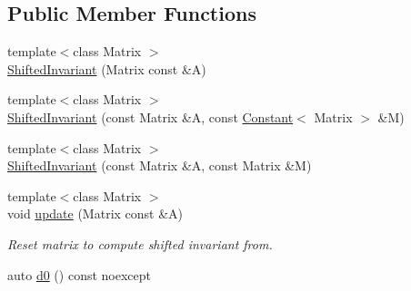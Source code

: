 \subsection*{Public Member Functions}
\begin{DoxyCompactItemize}
\item 
{\footnotesize template$<$class Matrix $>$ }\\\hyperlink{classFunG_1_1LinearAlgebra_1_1ShiftedInvariant_ac70bec154e9bc6f7c66f48e4b4c7dd6f}{Shifted\-Invariant} (Matrix const \&A)
\item 
{\footnotesize template$<$class Matrix $>$ }\\\hyperlink{classFunG_1_1LinearAlgebra_1_1ShiftedInvariant_adf0a75f28fee0f7bedda4ab30546cb5f}{Shifted\-Invariant} (const Matrix \&A, const \hyperlink{structFunG_1_1Constant}{Constant}$<$ Matrix $>$ \&M)
\item 
{\footnotesize template$<$class Matrix $>$ }\\\hyperlink{classFunG_1_1LinearAlgebra_1_1ShiftedInvariant_a49fcea056c8d69208daec7d2c97d57ab}{Shifted\-Invariant} (const Matrix \&A, const Matrix \&M)
\item 
\hypertarget{classFunG_1_1LinearAlgebra_1_1ShiftedInvariant_a88e70c0f3c5741a84828ce6b46a289ba}{{\footnotesize template$<$class Matrix $>$ }\\void \hyperlink{classFunG_1_1LinearAlgebra_1_1ShiftedInvariant_a88e70c0f3c5741a84828ce6b46a289ba}{update} (Matrix const \&A)}\label{classFunG_1_1LinearAlgebra_1_1ShiftedInvariant_a88e70c0f3c5741a84828ce6b46a289ba}

\begin{DoxyCompactList}\small\item\em Reset matrix to compute shifted invariant from. \end{DoxyCompactList}\item 
\hypertarget{classFunG_1_1LinearAlgebra_1_1ShiftedInvariant_a94093a636ffe05b72ff013525292e99b}{auto \hyperlink{classFunG_1_1LinearAlgebra_1_1ShiftedInvariant_a94093a636ffe05b72ff013525292e99b}{d0} () const noexcept}\label{classFunG_1_1LinearAlgebra_1_1ShiftedInvariant_a94093a636ffe05b72ff013525292e99b}


\end{DoxyCompactItemize}
